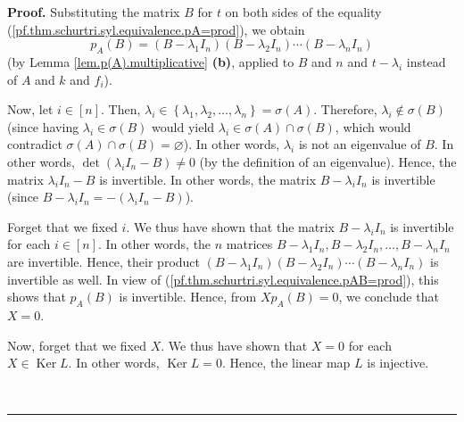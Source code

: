 \documentclass[numbers=enddot,12pt,final,onecolumn,notitlepage]{scrartcl}%
\numberwithin{exer}{subsection}
\theoremstyle{definition}
\newenvironment{proof}[1][Proof]{\noindent\textbf{#1.} }{\ \rule{0.5em}{0.5em}}
\begin{document}
\begin{proof}
Substituting the matrix $B$ for $t$ on both sides of the equality
(\ref{pf.thm.schurtri.syl.equivalence.pA=prod}), we obtain%
\begin{equation}
p_{A}\left(  B\right)  =\left(  B-\lambda_{1}I_{n}\right)  \left(
B-\lambda_{2}I_{n}\right)  \cdots\left(  B-\lambda_{n}I_{n}\right)
\label{pf.thm.schurtri.syl.equivalence.pAB=prod}%
\end{equation}
(by Lemma \ref{lem.p(A).multiplicative} \textbf{(b)}, applied to $B$ and $n$
and $t-\lambda_{i}$ instead of $A$ and $k$ and $f_{i}$).

Now, let $i\in\left[  n\right]  $. Then, $\lambda_{i}\in\left\{  \lambda
_{1},\lambda_{2},\ldots,\lambda_{n}\right\}  =\sigma\left(  A\right)  $.
Therefore, $\lambda_{i}\notin\sigma\left(  B\right)  $ (since having
$\lambda_{i}\in\sigma\left(  B\right)  $ would yield $\lambda_{i}\in
\sigma\left(  A\right)  \cap\sigma\left(  B\right)  $, which would contradict
$\sigma\left(  A\right)  \cap\sigma\left(  B\right)  =\varnothing$). In other
words, $\lambda_{i}$ is not an eigenvalue of $B$. In other words, $\det\left(
\lambda_{i}I_{n}-B\right)  \neq0$ (by the definition of an eigenvalue). Hence,
the matrix $\lambda_{i}I_{n}-B$ is invertible. In other words, the matrix
$B-\lambda_{i}I_{n}$ is invertible (since $B-\lambda_{i}I_{n}=-\left(
\lambda_{i}I_{n}-B\right)  $).

Forget that we fixed $i$. We thus have shown that the matrix $B-\lambda
_{i}I_{n}$ is invertible for each $i\in\left[  n\right]  $. In other words,
the $n$ matrices $B-\lambda_{1}I_{n},B-\lambda_{2}I_{n},\ldots,B-\lambda
_{n}I_{n}$ are invertible. Hence, their product $\left(  B-\lambda_{1}%
I_{n}\right)  \left(  B-\lambda_{2}I_{n}\right)  \cdots\left(  B-\lambda
_{n}I_{n}\right)  $ is invertible as well. In view of
(\ref{pf.thm.schurtri.syl.equivalence.pAB=prod}), this shows that
$p_{A}\left(  B\right)  $ is invertible. Hence, from $Xp_{A}\left(  B\right)
=0$, we conclude that $X=0$.

Now, forget that we fixed $X$. We thus have shown that $X=0$ for each
$X\in\operatorname*{Ker}L$. In other words, $\operatorname*{Ker}L=0$. Hence,
the linear map $L$ is injective.


\end{proof}
\end{document}
